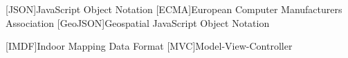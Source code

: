 \section*{}

\begin{acronym}
	[JSON]{JavaScript Object Notation}
	[ECMA]{European Computer Manufacturers Association}
	[GeoJSON]{Geospatial JavaScript Object Notation}

	[IMDF]{Indoor Mapping Data Format}
	[MVC]{Model-View-Controller}
\end{acronym}

\clearpage
